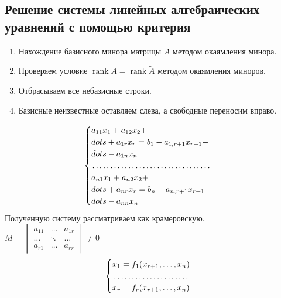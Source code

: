 \documentclass[a4paper, 12pt]{article}
\newcommand{\rank}{\operatorname{rank}}
\begin{document}
\subsection*{Решение системы линейных алгебраических уравнений с помощью критерия}
\begin{enumerate}
    \item Нахождение базисного минора матрицы $A$ методом окаямления минора.
    \item Проверяем условие $\rank A=\rank\widetilde{A}$ методом окаямления миноров.
    \item Отбрасываем все небазисные строки.
    \item Базисные неизвестные оставляем слева, а свободные переносим вправо.
\end{enumerate}
\begin{equation}
    \begin{cases}
    $$a_{11}x_1+a_{12}x_2+ \\dots + a_{1r}x_r = b_1-a_{1, r+1}x_{r+1}- \\dots -a_{1n}x_n$$\\
    $$\dotfill$$\\
    $$a_{n1}x_1+a_{n2}x_2+ \\dots + a_{nr}x_r = b_n-a_{n, r+1}x_{r+1}- \\dots -a_{nn}x_n$$
    \end{cases}
\end{equation}
Полученную систему рассматриваем как крамеровскую.\\
$M=
\begin{vmatrix}
a_{11} & \dots & a_{1r}\\
\dots & \ddots & \dots\\
a_{r1} & \dots & a_{rr}
\end{vmatrix} \neq 0$
\begin{equation*}
    \begin{cases}
    $$x_1=f_1(x_{r+1},\dots,x_n)$$\\
    \dotfill\\
    $$x_r=f_r(x_{r+1},\dots,x_n)$$
    \end{cases}
\end{equation*}
\end{document}
